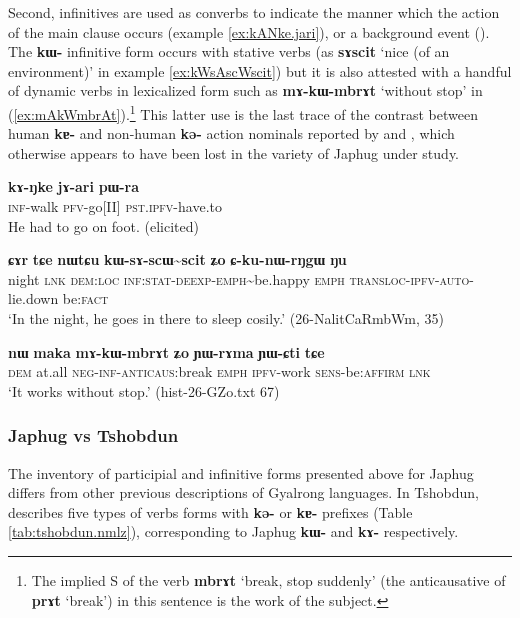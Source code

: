 \documentclass[oneside,a4paper,11pt]{article}
\newcommand{\ipa}[1]{\textbf{\phon#1}} %
\newcommand{\jpg}[2]{\ipa{#1} `#2'} %
\newcommand{\tld}{\textasciitilde{}}
\begin{document}
Second, infinitives are used as converbs to indicate the manner which the action of the main clause occurs (example \ref{ex:kANke.jari}), or a background event (\citealt{jacques14linking}). The \ipa{kɯ-} infinitive form occurs with stative verbs (as \jpg{sɤscit}{nice (of an environment)} in example \ref{ex:kWsAscWscit}) but it is also attested with a handful of dynamic verbs in lexicalized form such as \ipa{mɤ-kɯ-mbrɤt} `without stop' in (\ref{ex:mAkWmbrAt}).\footnote{The implied S of the verb \jpg{mbrɤt}{break, stop suddenly} (the anticausative of  \jpg{prɤt}{break}) in this sentence is the work of the subject.  } This latter use is the last trace of the contrast between human \ipa{kɐ-} and non-human \ipa{kə-} action nominals reported by \citet[476]{sun12complementation} and \citealt{jackson14morpho}, which otherwise appears to have been lost in the variety of Japhug under study.

\begin{exe}
\ex \label{ex:kANke.jari}
\gll
\ipa{kɤ-ŋke} 	\ipa{jɤ-ari} 	\ipa{pɯ-ra} \\
\textsc{inf}-walk \textsc{pfv}-go[II] \textsc{pst.ipfv}-have.to \\
\glt He had to go on foot. (elicited)
\end{exe}

\begin{exe}
\ex \label{ex:kWsAscWscit}
\gll
\ipa{ɕɤr} 	\ipa{tɕe} 	\ipa{nɯtɕu} 	\ipa{kɯ-sɤ-scɯ\tld{}scit} 	\ipa{ʑo} 	\ipa{ɕ-ku-nɯ-rŋgɯ} 	\ipa{ŋu} \\
night \textsc{lnk} \textsc{dem:loc} \textsc{inf:stat-deexp-emph}\tld{}be.happy \textsc{emph} \textsc{transloc-ipfv-auto}-lie.down be:\textsc{fact} \\
\glt `In the night, he goes in there to sleep cosily.' (26-NalitCaRmbWm, 35)
\end{exe}

\begin{exe}
\ex \label{ex:mAkWmbrAt}
\gll
 \ipa{nɯ} 	\ipa{maka} 	\ipa{mɤ-kɯ-mbrɤt} 	\ipa{ʑo} 	\ipa{ɲɯ-rɤma} 	\ipa{ɲɯ-ɕti} 	\ipa{tɕe} \\
 \textsc{dem} at.all \textsc{neg-inf-anticaus:}break \textsc{emph} \textsc{ipfv}-work \textsc{sens}-be:\textsc{affirm} \textsc{lnk} \\
\glt `It works without stop.' (hist-26-GZo.txt 67)
\end{exe}
 
\subsubsection{Japhug vs Tshobdun} \label{sec:tshobdun.k}
The inventory of participial and infinitive forms presented above for Japhug differs from other previous descriptions of Gyalrong languages. In Tshobdun, \citet[476]{sun12complementation} describes five types of verbs forms with \ipa{kə-} or \ipa{kɐ-} prefixes (Table \ref{tab:tshobdun.nmlz}), corresponding to Japhug \ipa{kɯ-} and \ipa{kɤ-} respectively.
\end{document}
